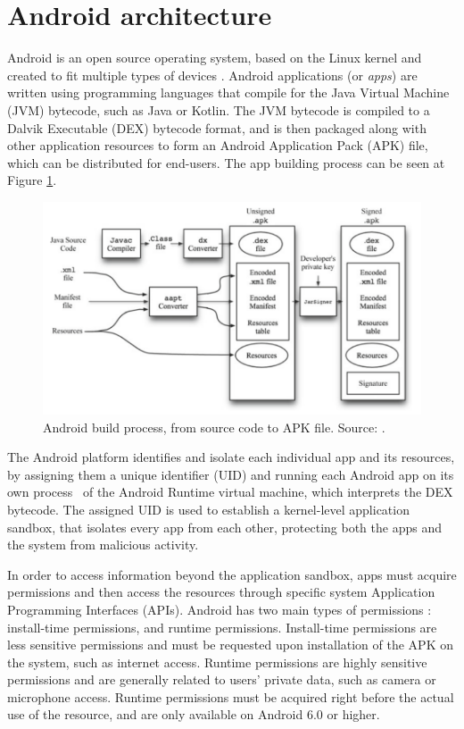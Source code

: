 \section{Android architecture}

Android is an open source operating system, based on the Linux kernel and created to fit multiple types of devices \cite{noauthor_platform_2023}.
Android applications (or \textit{apps}) are written using programming languages that compile for the Java Virtual Machine (JVM) bytecode, such as Java or Kotlin. The JVM bytecode is compiled to a Dalvik Executable (DEX) bytecode format, and is then packaged along with other application resources to form an Android Application Pack (APK) file, which can be distributed for end-users. The app building process can be seen at Figure \ref{fig:android-build}.

\begin{figure}
    \centering
    \includegraphics[width=\textwidth]{img/android_build.png}
    \caption{Android build process, from source code to APK file. Source: \cite{jung_repackaging_2013}.}
    \label{fig:android-build}
\end{figure}

The Android platform identifies and isolate each individual app and its resources, by assigning them a unique identifier (UID) and running each Android app on its own process~\cite{noauthor_application_2022} of the Android Runtime virtual machine, which interprets the DEX bytecode. The assigned UID is used to establish a kernel-level application sandbox, that isolates every app from each other, protecting both the apps and the system from malicious activity.

In order to access information beyond the application sandbox, apps must acquire permissions and then access the resources through specific system Application Programming Interfaces (APIs). Android has two main types of permissions \cite{noauthor_permissions_2023}: install-time permissions, and runtime permissions. Install-time permissions are less sensitive permissions and must be requested upon installation of the APK on the system, such as internet access. Runtime permissions are highly sensitive permissions and are generally related to users' private data, such as camera or microphone access. Runtime permissions must be acquired right before the actual use of the resource, and are only available on Android 6.0 or higher.



